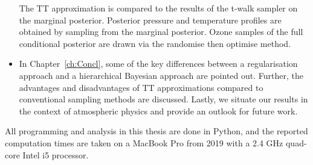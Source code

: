 \begin{itemize}
	The TT approximation is compared to the results of the t-walk sampler on the marginal posterior.
	Posterior pressure and temperature profiles are obtained by sampling from the marginal posterior.
	Ozone samples of the full conditional posterior are drawn via the randomise then optimise method.
	\item In Chapter~\ref{ch:Concl}, some of the key differences between a regularisation approach and a hierarchical Bayesian approach are pointed out. Further, the advantages and disadvantages of TT approximations compared to conventional sampling methods are discussed.
	Lastly, we situate our results in the context of atmospheric physics and provide an outlook for future work.
\end{itemize}
All programming and analysis in this thesis are done in Python, and the reported computation times are taken on a MacBook Pro from 2019 with a 2.4 GHz quad-core Intel i5 processor.